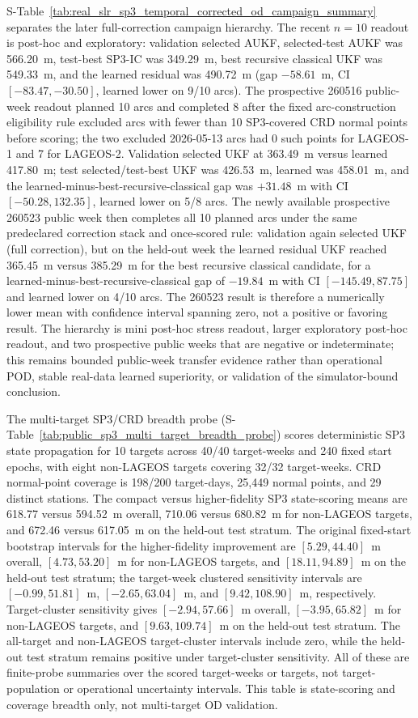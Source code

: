 \documentclass{article}
\begin{document}
S-Table~\ref{tab:real_slr_sp3_temporal_corrected_od_campaign_summary} separates the later full-correction campaign hierarchy. The recent $n=10$ readout is post-hoc and exploratory: validation selected AUKF, selected-test AUKF was 566.20~m, test-best SP3-IC was 349.29~m, best recursive classical UKF was 549.33~m, and the learned residual was 490.72~m (gap \(-58.61\)~m, CI \([-83.47,-30.50]\), learned lower on 9/10 arcs). The prospective 260516 public-week readout planned 10 arcs and completed 8 after the fixed arc-construction eligibility rule excluded arcs with fewer than 10 SP3-covered CRD normal points before scoring; the two excluded 2026-05-13 arcs had 0 such points for LAGEOS-1 and 7 for LAGEOS-2. Validation selected UKF at 363.49~m versus learned 417.80~m; test selected/test-best UKF was 426.53~m, learned was 458.01~m, and the learned-minus-best-recursive-classical gap was \(+31.48\)~m with CI \([-50.28,132.35]\), learned lower on 5/8 arcs. The newly available prospective 260523 public week then completes all 10 planned arcs under the same predeclared correction stack and once-scored rule: validation again selected UKF (full correction), but on the held-out week the learned residual UKF reached 365.45~m versus 385.29~m for the best recursive classical candidate, for a learned-minus-best-recursive-classical gap of \(-19.84\)~m with CI \([-145.49,87.75]\) and learned lower on 4/10 arcs. The 260523 result is therefore a numerically lower mean with confidence interval spanning zero, not a positive or favoring result. The hierarchy is mini post-hoc stress readout, larger exploratory post-hoc readout, and two prospective public weeks that are negative or indeterminate; this remains bounded public-week transfer evidence rather than operational POD, stable real-data learned superiority, or validation of the simulator-bound conclusion.

The multi-target SP3/CRD breadth probe (S-Table~\ref{tab:public_sp3_multi_target_breadth_probe}) scores deterministic SP3 state propagation for 10 targets across 40/40 target-weeks and 240 fixed start epochs, with eight non-LAGEOS targets covering 32/32 target-weeks. CRD normal-point coverage is 198/200 target-days, 25{,}449 normal points, and 29 distinct stations. The compact versus higher-fidelity SP3 state-scoring means are 618.77 versus 594.52~m overall, 710.06 versus 680.82~m for non-LAGEOS targets, and 672.46 versus 617.05~m on the held-out test stratum. The original fixed-start bootstrap intervals for the higher-fidelity improvement are $[5.29,44.40]$~m overall, $[4.73,53.20]$~m for non-LAGEOS targets, and $[18.11,94.89]$~m on the held-out test stratum; the target-week clustered sensitivity intervals are $[-0.99,51.81]$~m, $[-2.65,63.04]$~m, and $[9.42,108.90]$~m, respectively. Target-cluster sensitivity gives $[-2.94,57.66]$~m overall, $[-3.95,65.82]$~m for non-LAGEOS targets, and $[9.63,109.74]$~m on the held-out test stratum. The all-target and non-LAGEOS target-cluster intervals include zero, while the held-out test stratum remains positive under target-cluster sensitivity. All of these are finite-probe summaries over the scored target-weeks or targets, not target-population or operational uncertainty intervals. This table is state-scoring and coverage breadth only, not multi-target OD validation.
\end{document}
